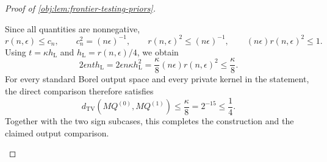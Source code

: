\begin{proof}[Proof of \cref{obj:lem:frontier-testing-priors}]
\begin{enumerate}
Since all quantities are nonnegative,
\[
r(n,\epsilon)\le c_n,\qquad
c_n^2=(n\epsilon)^{-1},\qquad
r(n,\epsilon)^2\le(n\epsilon)^{-1},
\qquad
(n\epsilon)r(n,\epsilon)^2\le1.
\]
Using \(t=\kappa h_{\mathrm L}\) and
\(h_{\mathrm L}=r(n,\epsilon)/4\), we obtain
\[
2\epsilon nth_{\mathrm L}
=2\epsilon n\kappa h_{\mathrm L}^2
=\frac{\kappa}{8}(n\epsilon)r(n,\epsilon)^2
\le\frac{\kappa}{8}.
\]
For every standard Borel output space and every private kernel in the
statement, the direct comparison therefore satisfies
\[
d_{\mathrm{TV}}(MQ^{(0)},MQ^{(1)})
\le\frac{\kappa}{8}
=2^{-15}\le\frac14.
\]
Together with the two sign subcases, this completes the construction and
the claimed output comparison.
\end{enumerate}
\end{proof}
